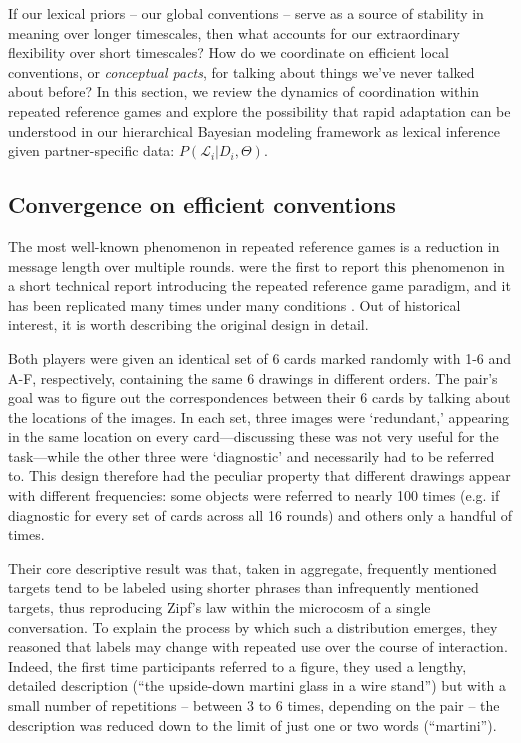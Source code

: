 \documentclass[11pt, floatsintext, jou]{apa6}
\begin{document}
If our lexical priors -- our global conventions -- serve as a source of stability in meaning over longer timescales, then what accounts for our extraordinary flexibility  over short timescales? How do we coordinate on efficient local conventions, or \emph{conceptual pacts}, for talking about things we've never talked about before? In this section, we review the dynamics of coordination within repeated reference games and explore the possibility that rapid adaptation can be understood in our hierarchical Bayesian modeling framework as lexical inference given partner-specific data: $P(\mathcal{L}_i | D_i, \Theta)$. 

\subsection{Convergence on efficient conventions}

The most well-known phenomenon in repeated reference games is a reduction in message length over multiple rounds.  were the first to report this phenomenon in a short technical report introducing the repeated reference game paradigm, and it has been replicated many times under many conditions \cite<most notably by>[in a much more streamlined experimental design using tangram shapes]{ClarkWilkesGibbs86_ReferringCollaborative}. Out of historical interest, it is worth describing the original design in detail. 

Both players were given an identical set of 6 cards marked randomly with 1-6 and A-F, respectively, containing the same 6 drawings in different orders. The pair's goal was to figure out the correspondences between their 6 cards by talking about the locations of the images. In each set, three images were `redundant,' appearing in the same location on every card---discussing these was not very useful for the task---while the other three were `diagnostic' and necessarily had to be referred to. This design therefore had the peculiar property that different drawings appear with different frequencies: some objects were referred to nearly 100 times (e.g. if diagnostic for every set of cards across all 16 rounds) and others only a handful of times. 

Their core descriptive result was that, taken in aggregate, frequently mentioned targets tend to be labeled using shorter phrases than infrequently mentioned targets, thus reproducing Zipf's law within the microcosm of a single conversation. To explain the process by which such a distribution emerges, they reasoned that labels may change with repeated use over the course of interaction. Indeed, the first time participants referred to a figure, they used a lengthy, detailed description (``the upside-down martini glass in a wire stand'') but with a small number of repetitions -- between 3 to 6 times, depending on the pair -- the description was reduced down to the limit of just one or two words (``martini''). 
\end{document}
